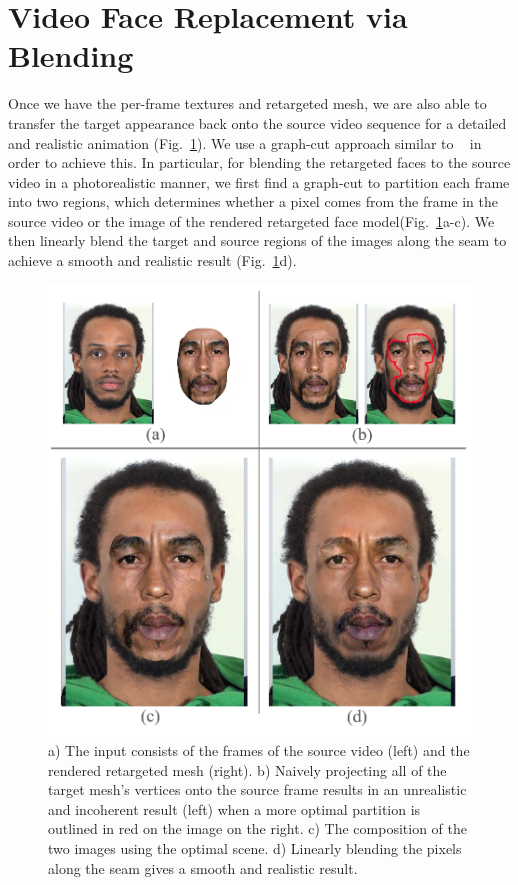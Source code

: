 

\section{Video Face Replacement via Blending}

Once we have the per-frame textures and retargeted mesh, we are also able to transfer the target appearance back onto the source video
sequence for a detailed and realistic animation (Fig.~\ref{fig:blend}). We use a graph-cut approach similar to ~\cite{replace} in order 
to achieve this.  In particular, for blending the retargeted faces to the source video in a photorealistic manner,
we first find a graph-cut to partition each frame into two regions, which determines whether 
a pixel comes from the frame in the source video or the image of the rendered retargeted face model(Fig.~\ref{fig:blend}a-c). 
We then linearly blend the target and source regions of the images along the seam to achieve a smooth and realistic result (Fig.~\ref{fig:blend}d).
 
\begin{figure}[t]
  \centering
  \includegraphics[width=0.6\linewidth]{figures/blending/blending_new_tidus.png}
  \caption{a) The input consists of the frames of the source video (left) and the rendered retargeted mesh (right). b) Naively projecting all of the target mesh's vertices onto the source frame results in an unrealistic and incoherent result (left) when a more optimal partition is outlined in red on the image on the right. 
	c) The composition of the two images using the optimal scene.
	d) Linearly blending the pixels along the seam gives a smooth and realistic result.}
	\label{fig:blend}
  \vspace{-0.15in}
\end{figure}



